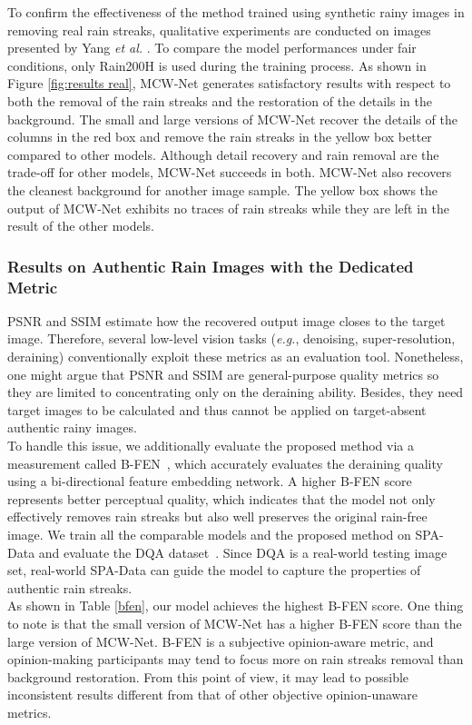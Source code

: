 \documentclass[a4paper,fleqn]{cas-dc}
\newcommand{\eg}[1]{\textit{e.g.}{#1}}
\begin{document}
To confirm the effectiveness of the method trained using synthetic rainy images in removing real rain streaks, qualitative experiments are conducted on images presented by Yang \textit{et al.} \cite{yang2017deep}. To compare the model performances under fair conditions, only Rain200H is used during the training process. As shown in Figure \ref{fig:results real}, MCW-Net generates satisfactory results with respect to both the removal of the rain streaks and the restoration of the details in the background. The small and large versions of MCW-Net recover the details of the columns in the red box and remove the rain streaks in the yellow box better compared to other models. Although detail recovery and rain removal are the trade-off for other models, MCW-Net succeeds in both. MCW-Net also recovers the cleanest background for another image sample. The yellow box shows the output of MCW-Net exhibits no traces of rain streaks while they are left in the result of the other models.


\subsubsection{Results on Authentic Rain Images with the Dedicated Metric}
\label{subsec:results_authentic}

PSNR and SSIM estimate how the recovered output image closes to the target image. Therefore, several low-level vision tasks (\eg, denoising, super-resolution, deraining) conventionally exploit these metrics as an evaluation tool. Nonetheless, one might argue that PSNR and SSIM are general-purpose quality metrics so they are limited to concentrating only on the deraining ability. Besides, they need target images to be calculated and thus cannot be applied on target-absent authentic rainy images.\\
To handle this issue, we additionally evaluate the proposed method via a measurement called B-FEN~\cite{wu2020subjective}, which accurately evaluates the deraining quality using a bi-directional feature embedding network. A higher B-FEN score represents better perceptual quality, which indicates that the model not only effectively removes rain streaks but also well preserves the original rain-free image. We train all the comparable models and the proposed method on SPA-Data and evaluate the DQA dataset~\cite{wu2020subjective}. Since DQA is a real-world testing image set, real-world SPA-Data can guide the model to capture the properties of authentic rain streaks.\\
As shown in Table \ref{bfen}, our model achieves the highest B-FEN score. One thing to note is that the small version of MCW-Net has a higher B-FEN score than the large version of MCW-Net. B-FEN is a subjective opinion-aware metric, and opinion-making participants may tend to focus more on rain streaks removal than background restoration. From this point of view, it may lead to possible inconsistent results different from that of other objective opinion-unaware metrics.
\end{document}
